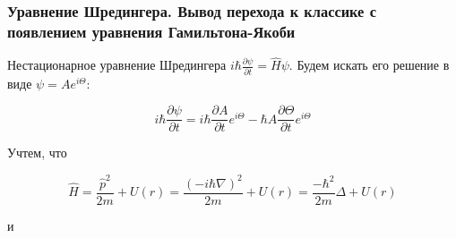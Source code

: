 
\subsubsection{Уравнение Шредингера. Вывод перехода к классике с появлением уравнения Гамильтона-Якоби}

Нестационарное уравнение Шредингера $i\hbar\frac{\partial \psi}{\partial t}=\hat{H}\psi$. Будем искать его решение в виде $\psi=Ae^{i\Theta}$:

$$
i\hbar \frac{\partial \psi}{\partial t}=i\hbar \frac{\partial A}{\partial t}e^{i\Theta}-\hbar A\frac{\partial \Theta}{\partial t}e^{i\Theta}
$$

Учтем, что 

$$\hat{H}=\frac{\hat{p}^2}{2m}+U(r)=\frac{(-i\hbar \nabla)^2}{2m}+U(r)=\frac{-\hbar^2}{2m}\Delta+U(r)$$

и

